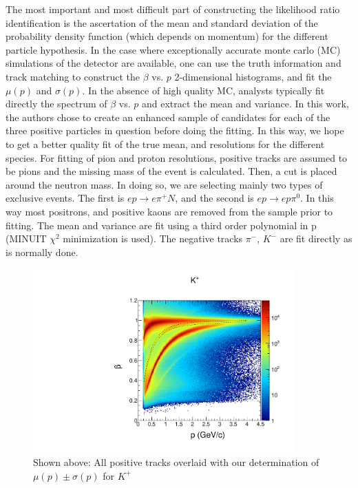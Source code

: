The most important and most difficult part of constructing the likelihood ratio identification is the ascertation of the mean and standard deviation of the probability density function (which depends on momentum) for the different particle hypothesis.  In the case where exceptionally accurate monte carlo (MC) simulations of the detector are available, one can use the truth information and track matching to construct the $\beta$ vs. $p$ 2-dimensional histograms, and fit the $\mu(p)$ and $\sigma(p)$.  In the absence of high quality MC, analysts typically fit directly the spectrum of $\beta$ vs. $p$ and extract the mean and variance.  In this work, the authors chose to create an enhanced sample of candidates for each of the three positive particles in question before doing the fitting.  In this way, we hope to get a better quality fit of the true mean, and resolutions for the different species.  For fitting of pion and proton resolutions, positive tracks are assumed to be pions and the missing mass of the event is calculated.  Then, a cut is placed around the neutron mass.  In doing so, we are selecting mainly two types of exclusive events.  The first is $ep \rightarrow e\pi^+N$, and the second is $ep \rightarrow ep\pi^0$.  In this way most positrons, and positive kaons are removed from the sample prior to fitting.  The mean and variance are fit using a third order polynomial in p (MINUIT $\chi^2$ minimization is used).  The negative tracks $\pi^-$, $K^-$ are fit directly as is normally done.


\begin{figure}
  \begin{center}
    \includegraphics[width=10cm]{image/plots/hadron-id/beautiful_pbeta_kp.pdf}
    \caption{ Shown above: All positive tracks overlaid with our determination of $\mu(p) \pm \sigma(p)$ for $K^+$}
  \end{center}
\end{figure}


